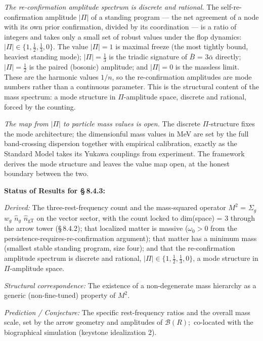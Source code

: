 \documentclass[11pt,oneside]{report}
\theoremstyle{definition}
\theoremstyle{remark}
\begin{document}
\emph{The re-confirmation amplitude spectrum is discrete and rational.}
The self-re-confirmation amplitude \ensuremath{|\Pi|} of a standing program --- the
net agreement of a node with its own prior confirmation, divided by its
coordination --- is a ratio of integers and takes only a small set of
robust values under the flop dynamics: \ensuremath{|\Pi| \in \{1, \tfrac{1}{2}, \tfrac{1}{3}, 0\}}. The
value \ensuremath{|\Pi| = 1} is maximal freeze (the most tightly bound, heaviest
standing mode); \ensuremath{|\Pi| = \tfrac{1}{3}} is the triadic signature of \ensuremath{\bar{B}} = \ensuremath{3\bar{\alpha}}
directly; \ensuremath{|\Pi| = \tfrac{1}{2}} is the paired (bosonic) amplitude; and \ensuremath{|\Pi| = 0}
is the massless limit. These are the harmonic values \ensuremath{1/n}, so the
re-confirmation amplitudes are mode numbers rather than a continuous
parameter. This is the structural content of the mass spectrum: a mode
structure in \ensuremath{\Pi}-amplitude space, discrete and rational, forced by the
counting.

\emph{The map from \ensuremath{|\Pi|} to particle mass values is open.} The discrete
\ensuremath{\Pi}-structure fixes the mode architecture; the dimensionful mass values in
MeV are set by the full band-crossing dispersion together with empirical
calibration, exactly as the Standard Model takes its Yukawa couplings from
experiment. The framework derives the mode structure and leaves the value
map open, at the honest boundary between the two.



\textbf{Status of Results for \S\,8.4.3:}

\emph{Derived:} The three-rest-frequency count and the mass-squared
operator \ensuremath{M^{2}} = \ensuremath{\Sigma_{g}} \ensuremath{w_{g}} \ensuremath{\hat{n}_{g}} \ensuremath{\hat{n}_{\mathrm{gT}}} on the vector sector, with the count
locked to dim(space) = 3 through the arrow tower (\S\,8.4.2); that localized
matter is massive (\ensuremath{\omega_0 > 0} from the persistence-requires-re-confirmation
argument); that matter has a minimum mass (smallest stable standing
program, size four); and that the re-confirmation amplitude spectrum is
discrete and rational, \ensuremath{|\Pi| \in \{1, \tfrac{1}{2}, \tfrac{1}{3}, 0\}}, a mode structure in
\ensuremath{\Pi}-amplitude space.

\emph{Structural correspondence:} The existence of a non-degenerate mass
hierarchy as a generic (non-fine-tuned) property of \ensuremath{M^{2}.}

\emph{Prediction / Conjecture:} The specific rest-frequency ratios and
the overall mass scale, set by the arrow geometry and amplitudes of
\ensuremath{\mathcal{B}(R);} co-located with the biographical simulation (keystone idealization
2).
\end{document}
